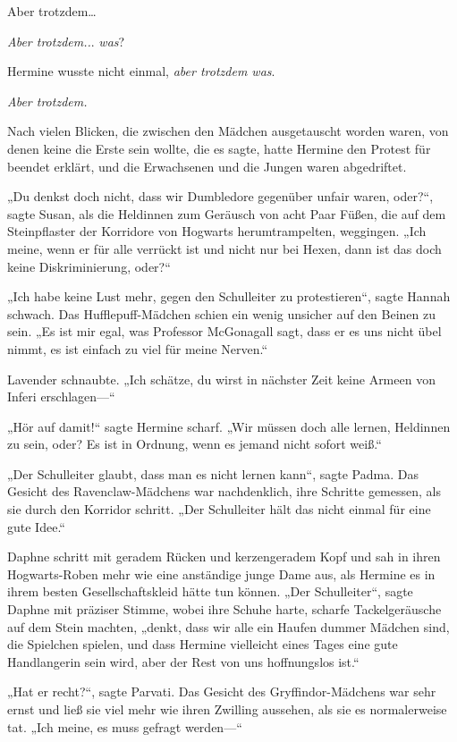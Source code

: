 {Aber trotzdem…

\emph{Aber trotzdem..}. \emph{was}?

Hermine wusste nicht einmal, \emph{aber trotzdem was}.

\emph{Aber trotzdem.}

Nach vielen Blicken, die zwischen den Mädchen ausgetauscht worden waren, von denen keine die Erste sein wollte, die es sagte, hatte Hermine den Protest für beendet erklärt, und die Erwachsenen und die Jungen waren abgedriftet.

„Du denkst doch nicht, dass wir Dumbledore gegenüber unfair waren, oder?“, sagte Susan, als die Heldinnen zum Geräusch von acht Paar Füßen, die auf dem Steinpflaster der Korridore von Hogwarts herumtrampelten, weggingen. „Ich meine, wenn er für alle verrückt ist und nicht nur bei Hexen, dann ist das doch keine Diskriminierung, oder?“

„Ich habe keine Lust mehr, gegen den Schulleiter zu protestieren“, sagte Hannah schwach. Das Hufflepuff-Mädchen schien ein wenig unsicher auf den Beinen zu sein. „Es ist mir egal, was Professor McGonagall sagt, dass er es uns nicht übel nimmt, es ist einfach zu viel für meine Nerven.“

Lavender schnaubte. „Ich schätze, du wirst in nächster Zeit keine Armeen von Inferi erschlagen—“

„Hör auf damit!“ sagte Hermine scharf. „Wir müssen doch alle lernen, Heldinnen zu sein, oder? Es ist in Ordnung, wenn es jemand nicht sofort weiß.“

„Der Schulleiter glaubt, dass man es nicht lernen kann“, sagte Padma. Das Gesicht des Ravenclaw-Mädchens war nachdenklich, ihre Schritte gemessen, als sie durch den Korridor schritt. „Der Schulleiter hält das nicht einmal für eine gute Idee.“

Daphne schritt mit geradem Rücken und kerzengeradem Kopf und sah in ihren Hogwarts-Roben mehr wie eine anständige junge Dame aus, als Hermine es in ihrem besten Gesellschaftskleid hätte tun können. „Der Schulleiter“, sagte Daphne mit präziser Stimme, wobei ihre Schuhe harte, scharfe Tackelgeräusche auf dem Stein machten, „denkt, dass wir alle ein Haufen dummer Mädchen sind, die Spielchen spielen, und dass Hermine vielleicht eines Tages eine gute Handlangerin sein wird, aber der Rest von uns hoffnungslos ist.“

„Hat er recht?“, sagte Parvati. Das Gesicht des Gryffindor-Mädchens war sehr ernst und ließ sie viel mehr wie ihren Zwilling aussehen, als sie es normalerweise tat. „Ich meine, es muss gefragt werden—“

}
